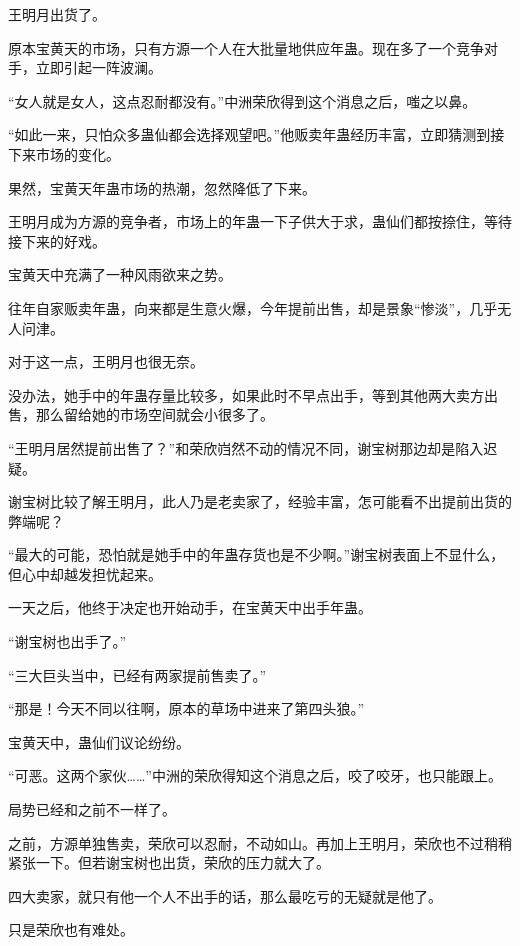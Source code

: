 
\begin{this_body}



王明月出货了。

原本宝黄天的市场，只有方源一个人在大批量地供应年蛊。现在多了一个竞争对手，立即引起一阵波澜。

“女人就是女人，这点忍耐都没有。”中洲荣欣得到这个消息之后，嗤之以鼻。

“如此一来，只怕众多蛊仙都会选择观望吧。”他贩卖年蛊经历丰富，立即猜测到接下来市场的变化。

果然，宝黄天年蛊市场的热潮，忽然降低了下来。

王明月成为方源的竞争者，市场上的年蛊一下子供大于求，蛊仙们都按捺住，等待接下来的好戏。

宝黄天中充满了一种风雨欲来之势。

往年自家贩卖年蛊，向来都是生意火爆，今年提前出售，却是景象“惨淡”，几乎无人问津。

对于这一点，王明月也很无奈。

没办法，她手中的年蛊存量比较多，如果此时不早点出手，等到其他两大卖方出售，那么留给她的市场空间就会小很多了。

“王明月居然提前出售了？”和荣欣岿然不动的情况不同，谢宝树那边却是陷入迟疑。

谢宝树比较了解王明月，此人乃是老卖家了，经验丰富，怎可能看不出提前出货的弊端呢？

“最大的可能，恐怕就是她手中的年蛊存货也是不少啊。”谢宝树表面上不显什么，但心中却越发担忧起来。

一天之后，他终于决定也开始动手，在宝黄天中出手年蛊。

“谢宝树也出手了。”

“三大巨头当中，已经有两家提前售卖了。”

“那是！今天不同以往啊，原本的草场中进来了第四头狼。”

宝黄天中，蛊仙们议论纷纷。

“可恶。这两个家伙……”中洲的荣欣得知这个消息之后，咬了咬牙，也只能跟上。

局势已经和之前不一样了。

之前，方源单独售卖，荣欣可以忍耐，不动如山。再加上王明月，荣欣也不过稍稍紧张一下。但若谢宝树也出货，荣欣的压力就大了。

四大卖家，就只有他一个人不出手的话，那么最吃亏的无疑就是他了。

只是荣欣也有难处。


\end{this_body}
